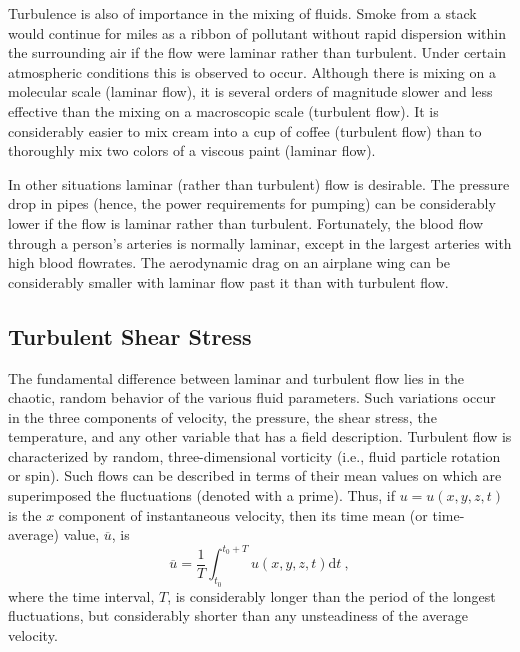 \documentclass[12pt,a4paper]{article}
\newcommand{\dif}{\mathrm{d}}
\begin{document}
Turbulence is also of importance in the mixing of fluids. Smoke from a stack would continue for miles as a ribbon of pollutant without rapid dispersion within the surrounding air if the flow were laminar rather than turbulent. Under certain atmospheric conditions this is observed to occur. Although there is mixing on a molecular scale (laminar flow), it is several orders of magnitude slower and less effective than the mixing on a macroscopic scale (turbulent flow). It is considerably easier to mix cream into a cup of coffee (turbulent flow) than to thoroughly mix two colors of a viscous paint (laminar flow).

In other situations laminar (rather than turbulent) flow is desirable. The pressure drop in pipes (hence, the power requirements for pumping) can be considerably lower if the flow is laminar rather than turbulent. Fortunately, the blood flow through a person's arteries is normally laminar, except in the largest arteries with high blood flowrates. The aerodynamic drag on an airplane wing can be considerably smaller with laminar flow past it than with turbulent flow.


\subsection{Turbulent Shear Stress}
\cite{munson2009fundamentals, munson2012fundamentals} The fundamental difference between laminar and turbulent flow lies in the chaotic, random behavior of the various fluid parameters. Such variations occur in the three components of velocity, the pressure, the shear stress, the temperature, and any other variable that has a field description. Turbulent flow is characterized by random, three-dimensional vorticity (i.e., fluid particle rotation or spin). Such flows can be described in terms of their mean values  on which are superimposed the fluctuations (denoted with a prime). Thus, if $u = u(x, y, z, t)$ is the $x$ component of instantaneous velocity, then its time mean (or time-average) value, $\overline{u}$, is
\begin{equation}
\overline{u} = \dfrac{1}{T} \int_{t_0}^{t_0 +T} u(x, y, z, t) \dif t ~,
\end{equation}
where the time interval, $T$, is considerably longer than the period of the longest fluctuations, but considerably shorter than any unsteadiness of the average velocity.
\end{document}

